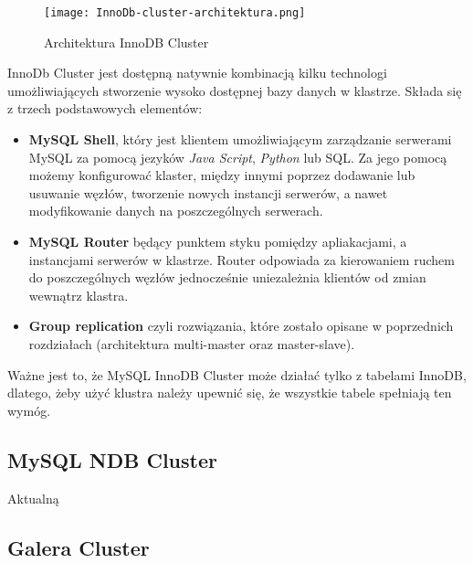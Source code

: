 \begin{figure}[!h]
	\caption{Architektura InnoDB Cluster}
	\centering
	\texttt{[image: InnoDb-cluster-architektura.png]}
	\label{fig:label}
\end{figure}
InnoDb Cluster jest dostępną natywnie kombinacją kilku technologi umożliwiających stworzenie wysoko dostępnej bazy danych w klastrze. Składa się z trzech podstawowych elementów:
\begin{itemize}
	\item \textbf{MySQL Shell}, który jest klientem umożliwiającym zarządzanie serwerami MySQL za pomocą jezyków \textit{Java Script}, \textit{Python} lub SQL. Za jego pomocą możemy konfigurować klaster, między innymi poprzez dodawanie lub usuwanie węzłów, tworzenie nowych instancji serwerów, a nawet modyfikowanie danych na poszczególnych serwerach.
	\item \textbf{MySQL Router} będący punktem styku pomiędzy apliakacjami, a instancjami serwerów w klastrze. Router odpowiada za kierowaniem ruchem do poszczególnych węzłów jednocześnie uniezależnia klientów od zmian wewnątrz klastra. 
	\item \textbf{Group replication} czyli rozwiązania, które zostało opisane w poprzednich rozdziałach (architektura multi-master oraz master-slave).
\end{itemize}
Ważne jest to, że MySQL InnoDB Cluster może działać tylko z tabelami InnoDB, dlatego, żeby użyć klustra należy upewnić się, że wszystkie tabele spełniają ten wymóg.

\subsection{MySQL NDB Cluster}
Aktualną 

\subsection{Galera Cluster}